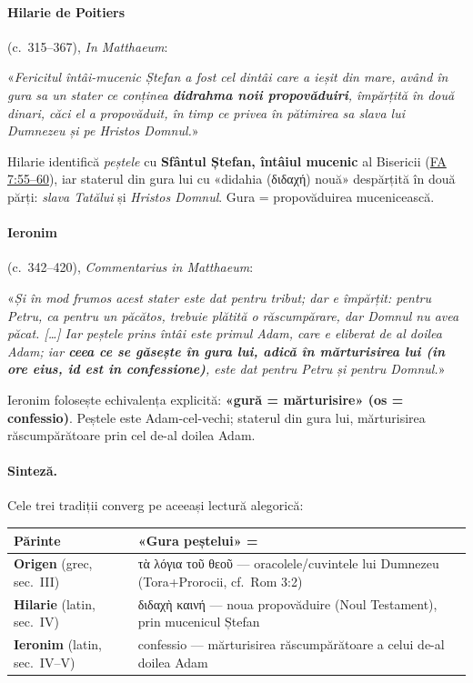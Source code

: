 \documentclass[12pt,a4paper,twoside,openany]{book}
\begin{document}
\paragraph*{Hilarie de Poitiers} (c.~315--367), \textit{In Matthaeum}:
\begin{biblequote}
«\textit{Fericitul întâi-mucenic Ștefan a fost cel dintâi care a ieșit din mare, având în gura sa un stater ce conținea \textbf{didrahma noii propovăduiri}, împărțită în două dinari, căci el a propovăduit, în timp ce privea în pătimirea sa slava lui Dumnezeu și pe Hristos Domnul.}»
\end{biblequote}

Hilarie identifică \textit{peștele} cu \textbf{Sfântul Ștefan, întâiul mucenic} al Bisericii (\href{https://bibliaortodoxa.ro/carte.php?id=51\&cap=7\#55}{FA 7:55--60}), iar staterul din gura lui cu «didahia (διδαχή) nouă» despărțită în două părți: \textit{slava Tatălui} și \textit{Hristos Domnul}. Gura = propovăduirea mucenicească.

\paragraph*{Ieronim} (c.~342--420), \textit{Commentarius in Matthaeum}:
\begin{biblequote}
«\textit{Și în mod frumos acest stater este dat pentru tribut; dar e împărțit: pentru Petru, ca pentru un păcătos, trebuie plătită o răscumpărare, dar Domnul nu avea păcat. [\ldots] Iar peștele prins întâi este primul Adam, care e eliberat de al doilea Adam; iar \textbf{ceea ce se găsește în gura lui, adică în mărturisirea lui (in ore eius, id est in confessione)}, este dat pentru Petru și pentru Domnul.}»
\end{biblequote}

Ieronim folosește echivalența explicită: \textbf{«gură = mărturisire» (os = confessio)}. Peștele este Adam-cel-vechi; staterul din gura lui, mărturisirea răscumpărătoare prin cel de-al doilea Adam.

\paragraph*{Sinteză.} Cele trei tradiții converg pe aceeași lectură alegorică:

\begin{center}
\small
\begin{tabular}{L{3cm}L{11cm}}
\toprule
{}
\textbf{Părinte} & \textbf{«Gura peștelui» =} \\
\midrule
\textbf{Origen} (grec, sec.~III) & τὰ λόγια τοῦ θεοῦ --- oracolele/cuvintele lui Dumnezeu (Tora+Prorocii, cf.~Rom 3:2) \\
\textbf{Hilarie} (latin, sec.~IV) & διδαχὴ καινή --- noua propovăduire (Noul Testament), prin mucenicul Ștefan \\
\textbf{Ieronim} (latin, sec.~IV--V) & confessio --- mărturisirea răscumpărătoare a celui de-al doilea Adam \\
\bottomrule
\end{tabular}
\end{center}
\end{document}
